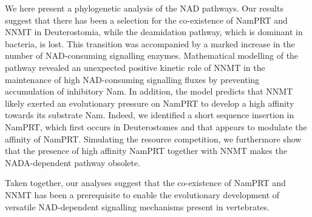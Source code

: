 We here present a phylogenetic analysis of the NAD pathways. Our results suggest that there has been a selection for the co-existence of NamPRT and NNMT in Deuterostomia, while the deamidation pathway, which is dominant in bacteria, is lost. This transition was accompanied by a marked increase in the number of NAD-consuming signalling enzymes. Mathematical modelling of the pathway revealed an unexpected positive kinetic role of NNMT in the maintenance of high NAD-consuming signalling fluxes by preventing accumulation of inhibitory Nam. In addition, the model predicts that NNMT likely exerted an evolutionary pressure on NamPRT to develop a high affinity towards its substrate Nam. Indeed, we identified a short sequence insertion in NamPRT, which first occurs in Deuterostomes and that appears to modulate the affinity of NamPRT. Simulating the resource competition, we furthermore show that the presence of high affinity NamPRT together with NNMT makes the NADA-dependent pathway obsolete.

Taken together, our analyses suggest that the co-existence of NamPRT and NNMT has been a prerequisite to enable the evolutionary development of versatile NAD-dependent signalling mechanisms present in vertebrates.
